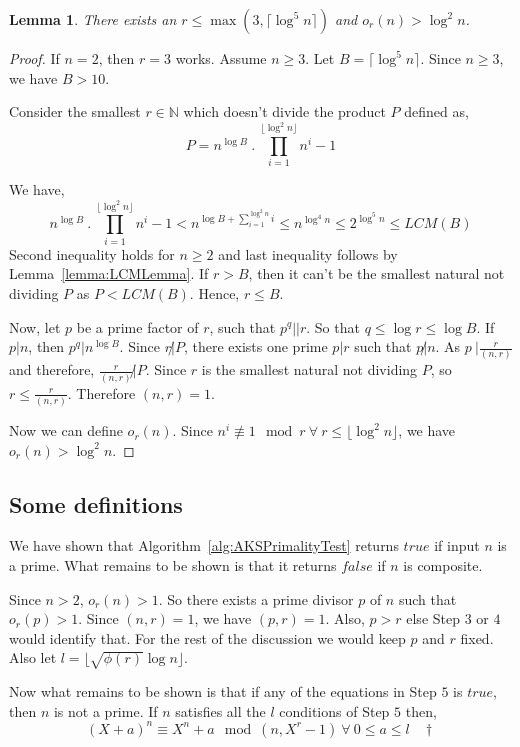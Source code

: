 \documentclass[11pt]{report}
\newtheorem{lemma}[theorem]{Lemma}
\begin{document}
\begin{lemma}
\label{lemma:AKSLemma2}
There exists an $r \leq \max(3, \lceil \log^5 n \rceil)$ and $o_r(n) > \log^2 n$.
\end{lemma}
\begin{proof}
If $n = 2$, then $r = 3$ works. Assume $n \geq 3$. Let $B = \lceil \log^5 n \rceil$. Since $n \geq 3$, we have $B > 10$. 

Consider the smallest $r \in \mathbb{N}$ which doesn't divide the product $P$ defined as,
\[P = n^{\log B}\ .\ \prod_{i=1}^{\lfloor \log^2 n \rfloor}{n^i-1} \]

We have,
\[n^{\log B}\ .\ \prod_{i=1}^{\lfloor \log^2 n \rfloor}{n^i-1} < n^{\log B + \sum_{i=1}^{\log^2 n}i} \leq n^{\log^4 n} \leq 2^{\log^5 n} \leq LCM(B)\]
Second inequality holds for $n \geq 2$ and last inequality follows by Lemma~\ref{lemma:LCMLemma}. If $r > B$, then it can't be the smallest natural not dividing $P$ as $P < LCM(B)$. Hence, $r \leq B$.

Now, let $p$ be a prime factor of $r$, such that $p^q || r$. So that $q \leq \log r \leq \log B$. If $p | n$, then $p^q | n^{\log B}$. Since $r \not | P$, there exists one prime $p | r$ such that $p \not | n$. As $p \ |  \frac{r}{(n,r)}$ and therefore, $\frac{r}{(n,r)} \not | P$. Since $r$ is the smallest natural not dividing $P$, so $r \leq \frac{r}{(n,r)}$. Therefore $(n,r) = 1$. 

Now we can define $o_r(n)$. Since $n^i \not \equiv 1 \mod r \ \forall \ r \leq \lfloor \log^2 n \rfloor$, we have $o_r(n) > \log^2 n$.
\end{proof}

\subsection{Some definitions}
We have shown that Algorithm~\ref{alg:AKSPrimalityTest} returns $true$ if input $n$ is a prime. What remains to be shown is that it returns $false$ if $n$ is composite.

Since $n > 2$, $o_r(n) > 1$. So there exists a prime divisor $p$ of $n$ such that $o_r(p) > 1$. Since $(n,r) = 1$, we have $(p,r) = 1$. Also, $p > r$ else Step $3$ or $4$ would identify that. For the rest of the discussion we would keep $p$ and $r$ fixed. Also let $l = \lfloor \sqrt{\phi(r)} \log n \rfloor$.

Now what remains to be shown is that if any of the equations in Step $5$ is $true$, then $n$ is not a prime. If $n$ satisfies all the $l$ conditions of Step $5$ then,
\[(X+a)^n \equiv X^n + a \mod (n, X^r - 1)\ \forall\ 0 \leq a \leq l \ \ \ \ \dagger\]
\end{document}
